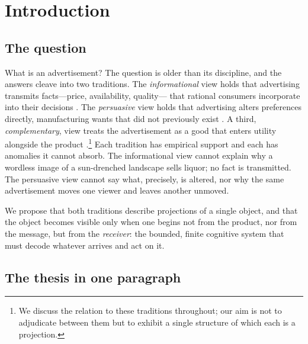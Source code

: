 \documentclass[twocolumn,11pt,a4paper]{article}
\theoremstyle{adv}
\theoremstyle{definition}
\theoremstyle{remark}
\begin{document}
\section{Introduction}
\label{sec:intro}

\subsection{The question}

What is an advertisement? The question is older than its discipline, and
the answers cleave into two traditions. The \emph{informational} view
holds that advertising transmits facts---price, availability, quality---
that rational consumers incorporate into their decisions
\citep{stigler1961,nelson1974,milgrom1986}. The \emph{persuasive} view
holds that advertising alters preferences directly, manufacturing wants
that did not previously exist \citep{dixit1978,bagwell2007}. A third,
\emph{complementary}, view treats the advertisement as a good that enters
utility alongside the product \citep{becker1993}.\footnote{We discuss the
relation to these traditions throughout; our aim is not to adjudicate
between them but to exhibit a single structure of which each is a
projection.} Each tradition has empirical support and each has anomalies
it cannot absorb. The informational view cannot explain why a wordless
image of a sun-drenched landscape sells liquor; no fact is transmitted.
The persuasive view cannot say what, precisely, is altered, nor why the
same advertisement moves one viewer and leaves another unmoved.

We propose that both traditions describe projections of a single object,
and that the object becomes visible only when one begins not from the
product, nor from the message, but from the \emph{receiver}: the bounded,
finite cognitive system that must decode whatever arrives and act on it.

\subsection{The thesis in one paragraph}
\end{document}
